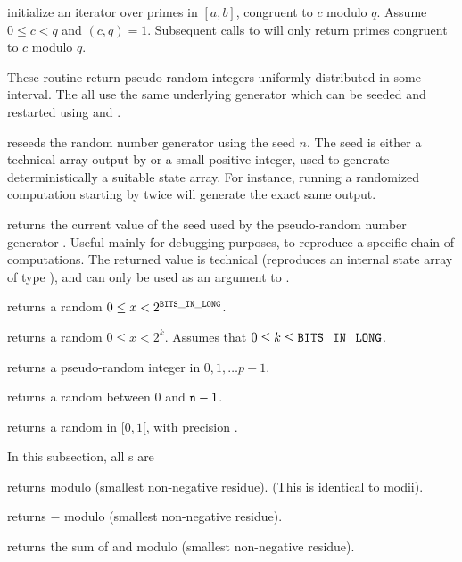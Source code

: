  initialize an iterator over primes in $[a,b]$, congruent to $c$
modulo $q$. Assume $0 \leq c < q$ and $(c,q) = 1$. Subsequent calls to
 will only return primes congruent to $c$ modulo $q$.

These routine return pseudo-random integers uniformly distributed in some
interval. The all use the same underlying generator which can be seeded and
restarted using  and .

 reseeds the random number generator using the
seed $n$. The seed is either a technical array output by 
or a small positive integer, used to generate deterministically a suitable
state array. For instance, running a randomized computation starting by
 twice will generate the exact same output.

 returns the current value of the seed used by the
pseudo-random number generator . Useful mainly for debugging
purposes, to reproduce a specific chain of computations. The returned value
is technical (reproduces an internal state array of type ),
and can only be used as an argument to .

 returns a random $0 \leq x < 2^{\tt BITS\_IN\_LONG}$.

 returns a random $0 \leq x < 2^k$. Assumes
that $0 \leq k \leq {\tt BITS\_IN\_LONG}$.

 returns a pseudo-random integer
in $0, 1, \dots p-1$.

 returns a random  between $0$ and ${\tt n}
- 1$.

 returns a random  in $[0,1[$, with
precision .

 In this subsection, all s are 

 returns  modulo  (smallest
non-negative residue). (This is identical to modii).

 returns $-$ modulo  (smallest
non-negative residue).

 returns the sum of  and
 modulo  (smallest non-negative residue).

